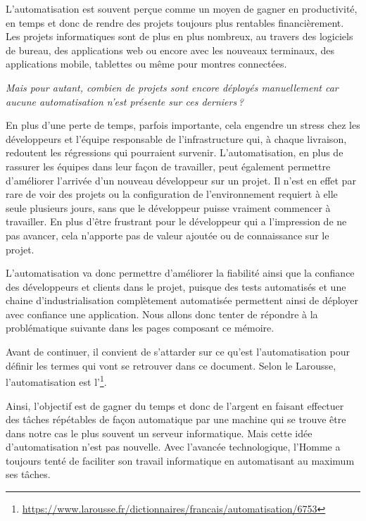 
L'automatisation est souvent perçue comme un moyen de gagner en productivité, en temps et donc de rendre des projets toujours plus rentables financièrement. Les projets informatiques sont de plus en plus nombreux, au travers des logiciels de bureau, des applications web ou encore avec les nouveaux terminaux, des applications mobile, tablettes ou même pour montres connectées.
	
\emph{Mais pour autant, combien de projets sont encore déployés manuellement car aucune automatisation n'est présente sur ces derniers ?}
	
En plus d'une perte de temps, parfois importante, cela engendre un stress chez les développeurs et l'équipe responsable de l'infrastructure qui, à chaque livraison, redoutent les régressions qui pourraient survenir. L'automatisation, en plus de rassurer les équipes dans leur façon de travailler, peut également permettre d'améliorer l'arrivée d'un nouveau développeur sur un projet. Il n'est en effet par rare de voir des projets ou la configuration de l'environnement requiert à elle seule plusieurs jours, sans que le développeur puisse vraiment commencer à travailler. En plus d'être frustrant pour le développeur qui a l'impression de ne pas avancer, cela n'apporte pas de valeur ajoutée ou de connaissance sur le projet.

L'automatisation va donc permettre d'améliorer la fiabilité ainsi que la confiance des développeurs et clients dans le projet, puisque des tests automatisés et une chaine d'industrialisation complètement automatisée permettent ainsi de déployer avec confiance une application. Nous allons donc tenter de répondre à la problématique suivante dans les pages composant ce mémoire.

\hrulefill

{\large \problematique}

\hrulefill

Avant de continuer, il convient de s'attarder sur ce qu'est l'automatisation pour définir les termes qui vont se retrouver dans ce document. Selon le Larousse, l'automatisation est l'\footnote{\url{https://www.larousse.fr/dictionnaires/francais/automatisation/6753}}. 

Ainsi, l'objectif est de gagner du temps et donc de l'argent en faisant effectuer des tâches répétables de façon automatique par une machine qui se trouve être dans notre cas le plus souvent un serveur informatique. Mais cette idée d'automatisation n'est pas nouvelle. Avec l'avancée technologique, l'Homme a toujours tenté de faciliter son travail informatique en automatisant au maximum ses tâches. 


